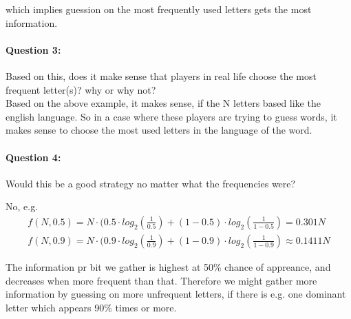 \documentclass[paper=a4, fontsize=11pt]{scrartcl} %
\numberwithin{equation}{section} %
\numberwithin{figure}{section} %
\numberwithin{table}{section} %
\begin{document}
	which implies guession on the most frequently used letters gets the most information.

	\paragraph{Question 3: }Based on this, does it make sense that players in real life choose the most frequent letter(s)? why or why not? \\
	
	Based on the above example, it makes sense, if the N letters based like the english language. So in a case where these players are trying to guess words, it makes sense to choose the most used letters in the language of the word.

	\paragraph{Question 4: }Would this be a good strategy no matter what the frequencies were?
	
	No, e.g.
	\begin{align*}
	f(N,0.5)=N\cdot (0.5\cdot log_2\left(\frac{1}{0.5}\right)+(1-0.5)\cdot log_2\left(\frac{1}{1-0.5}\right) = 0.301N \\
	f(N,0.9)=N\cdot (0.9\cdot log_2\left(\frac{1}{0.9}\right)+(1-0.9)\cdot log_2\left(\frac{1}{1-0.9}\right) \approx 0.1411N 
	\end{align*}

	The information pr bit we gather is highest at 50\% chance of appreance, and decreases when more frequent than that. Therefore we might gather more information by guessing on more unfrequent letters, if there is e.g. one dominant letter which appears 90\% times or more.
\end{document}

